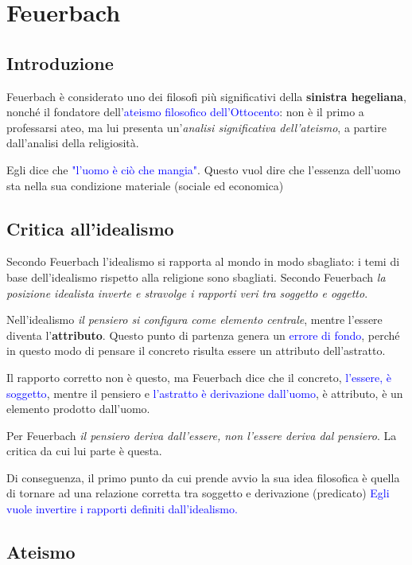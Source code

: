 \documentclass[a4paper, twoside, titlepage]{book}
\renewcommand{\emph}[1]{\textcolor{blue}{#1}}
\begin{document}
\part{Feuerbach}

\chapter*{Introduzione}

Feuerbach è considerato uno dei filosofi più significativi della \textbf{sinistra hegeliana}, nonché il fondatore dell'\emph{ateismo filosofico dell'Ottocento}: non è il primo a professarsi ateo, ma lui presenta un'\textit{analisi significativa dell'ateismo}, a partire dall'analisi della religiosità.

Egli dice che \emph{"l'uomo è ciò che mangia"}. Questo vuol dire che l'essenza dell'uomo sta nella sua condizione materiale (sociale ed economica)

\chapter{Critica all'idealismo}

Secondo Feuerbach l'idealismo si rapporta al mondo in modo sbagliato: i temi di base dell'idealismo rispetto alla religione sono sbagliati. Secondo Feuerbach \textit{la posizione idealista inverte e stravolge i rapporti veri tra soggetto e oggetto}.

Nell'idealismo \textit{il pensiero si configura come elemento centrale}, mentre l'essere diventa l'\textbf{attributo}. Questo punto di partenza genera un \emph{errore di fondo}, perché in questo modo di pensare il concreto risulta essere un attributo dell'astratto.

Il rapporto corretto non è questo, ma Feuerbach dice che il concreto, \emph{l'essere, è soggetto}, mentre il pensiero e \emph{l'astratto è derivazione dall'uomo}, è attributo, è un elemento prodotto dall'uomo.

Per Feuerbach \textit{il pensiero deriva dall'essere, non l'essere deriva dal pensiero}. La critica da cui lui parte è questa.

Di conseguenza, il primo punto da cui prende avvio la sua idea filosofica è quella di tornare ad una relazione corretta tra soggetto e derivazione (predicato)
\emph{Egli vuole invertire i rapporti definiti dall'idealismo.}

\chapter{Ateismo}
\end{document}
